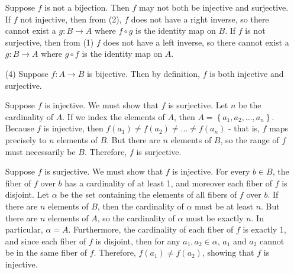 \documentclass[12pt]{article}
\begin{document}
\begin{itemize}
Suppose $f$ is not a bijection. Then $f$ may not both be injective and surjective. If $f$ not injective, then from (2), $f$ does not have a right inverse, so there cannot exist a $g : B \rightarrow A$ where $f \circ g$ is the identity map on $B$. If $f$ is not surjective, then from (1) $f$ does not have a left inverse, so there cannot exist a $g : B \rightarrow A$ where $g \circ f$ is the identity map on $A$.

\item[(4)] Suppose $f : A \rightarrow B$ is bijective. Then by definition, $f$ is both injective and surjective.

Suppose $f$ is injective. We must show that $f$ is surjective. Let $n$ be the cardinality of $A$. If we index the elements of $A$, then $A = \left\lbrace a_1, a_2, ..., a_n \right\rbrace$. Because $f$ is injective, then $f(a_1) \neq f(a_2) \neq ... \neq f(a_n)$ - that is, $f$ maps precisely to $n$ elements of $B$. But there are $n$ elements of $B$, so the range of $f$ must necessarily be $B$. Therefore, $f$ is surjective.

Suppose $f$ is surjective. We must show that $f$ is injective. For every $b \in B$, the fiber of $f$ over $b$ has a cardinality of at least 1, and moreover each fiber of $f$ is disjoint. Let $\alpha$ be the set containing the elements of all fibers of $f$ over $b$. If there are $n$ elements of $B$, then the cardinality of $\alpha$ must be at least $n$. But there are $n$ elements of $A$, so the cardinality of $\alpha$ must be exactly $n$. In particular, $\alpha = A$. Furthermore, the cardinality of each fiber of $f$ is exactly 1, and since each fiber of $f$ is disjoint, then for any $a_1, a_2 \in \alpha$, $a_1$ and $a_2$ cannot be in the same fiber of $f$. Therefore, $f(a_1) \neq f(a_2)$, showing that $f$ is injective.
\end{itemize}
\end{document}
